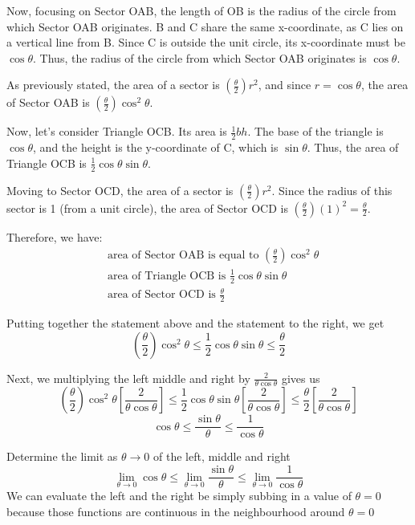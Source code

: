 \documentclass{article}
\begin{document}
Now, focusing on Sector OAB, the length of OB is the radius of the circle from which Sector OAB originates. B and C share the same x-coordinate, as C lies on a vertical line from B. Since C is outside the unit circle, its x-coordinate must be $\cos \theta$. Thus, the radius of the circle from which Sector OAB originates is $\cos \theta$.

As previously stated, the area of a sector is $\left(\frac{\theta}{2}\right)r^2$, and since $r=\cos \theta$, the area of Sector OAB is $\left(\frac{\theta}{2}\right)\cos^2\theta$.

Now, let’s consider Triangle OCB. Its area is $\frac{1}{2}bh$. The base of the triangle is $\cos \theta$, and the height is the y-coordinate of C, which is $\sin \theta$. Thus, the area of Triangle OCB is $\frac{1}{2}\cos \theta \sin \theta$.

Moving to Sector OCD, the area of a sector is $\left(\frac{\theta}{2}\right)r^2$. Since the radius of this sector is 1 (from a unit circle), the area of Sector OCD is $\left(\frac{\theta}{2}\right)(1)^2 = \frac{\theta}{2}$.

Therefore, we have:
\begin{align*}
    &\text{area of Sector OAB is equal to } \left(\frac{\theta}{2} \right)\cos^2\theta\\
    &\text{area of Triangle OCB is } \frac{1}{2}\cos \theta \sin \theta \\
    &\text{area of Sector OCD is } \frac{\theta}{2}
\end{align*}


Putting together the statement above and the statement to the right, we get
\begin{equation*}
    \left(\frac{\theta}{2} \right)\cos^2\theta \leq \frac{1}{2}\cos \theta \sin \theta \leq \frac{\theta}{2}
\end{equation*}

Next, we multiplying the left middle and right by $\frac{2}{\theta \cos \theta}$ gives us 
$$
    \left(\frac{\theta}{2}\right) \cos ^2 \theta \left[\frac{2}{\theta \cos \theta}\right] \leq \frac{1}{2}\cos \theta \sin \theta \left[\frac{2}{\theta \cos \theta}\right] \leq \frac{\theta}{2} \left[\frac{2}{\theta \cos \theta}\right]
$$
$$\cos \theta \leq \frac{\sin \theta}{\theta} \leq \frac{1}{\cos \theta}$$

Determine the limit as $\theta \to 0$ of the left, middle and right
$$\lim_{\theta \to 0}\cos \theta \leq \lim_{\theta \to 0}\frac{\sin \theta}{\theta} \leq \lim_{\theta \to 0}\frac{1}{\cos \theta}$$
We can evaluate the left and the right be simply subbing in a value of $\theta=0$ because those functions are continuous in the neighbourhood around $\theta=0$
\end{document}
